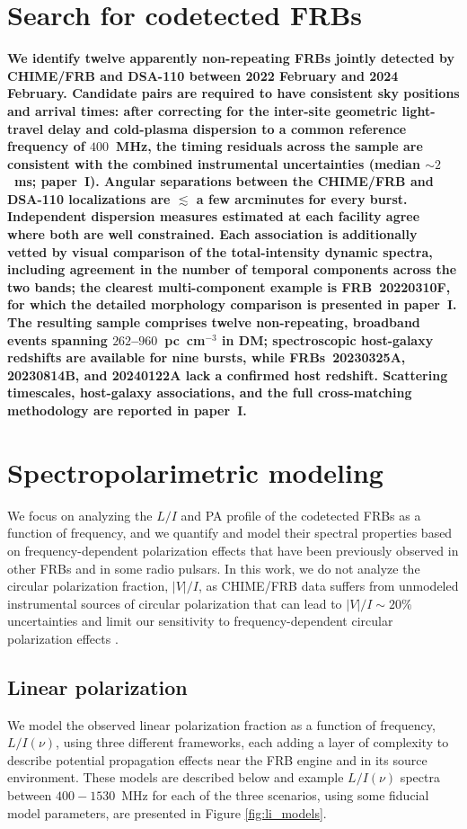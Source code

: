 \documentclass[twocolumn, linenumbers]{aastex701}
\newcommand{\newchange}[1]{{\color{red}\textbf{#1}}}
\begin{document}
\section{Search for codetected FRBs} \label{sec:obs_codetections}
\newchange{We identify twelve apparently non-repeating FRBs jointly detected by CHIME/FRB and DSA-110 between 2022 February and 2024 February. Candidate pairs are required to have consistent sky positions and arrival times: after correcting for the inter-site geometric light-travel delay and cold-plasma dispersion to a common reference frequency of $400$~MHz, the timing residuals across the sample are consistent with the combined instrumental uncertainties (median $\sim 2$~ms; paper~I). Angular separations between the CHIME/FRB and DSA-110 localizations are $\lesssim$ a few arcminutes for every burst. Independent dispersion measures estimated at each facility agree where both are well constrained. Each association is additionally vetted by visual comparison of the total-intensity dynamic spectra, including agreement in the number of temporal components across the two bands; the clearest multi-component example is FRB~20220310F, for which the detailed morphology comparison is presented in paper~I. The resulting sample comprises twelve non-repeating, broadband events spanning $262$--$960$~pc~cm$^{-3}$ in DM; spectroscopic host-galaxy redshifts are available for nine bursts, while FRBs~20230325A, 20230814B, and 20240122A lack a confirmed host redshift. Scattering timescales, host-galaxy associations, and the full cross-matching methodology are reported in paper~I.}


\section{Spectropolarimetric modeling} \label{sec:models}
We focus on analyzing the $L/I$ and PA profile of the codetected FRBs as a function of frequency, and we quantify and model their spectral properties based on frequency-dependent polarization effects that have been previously observed in other FRBs and in some radio pulsars. In this work, we do not analyze the circular polarization fraction, $|V|/I$, as CHIME/FRB data suffers from unmodeled instrumental sources of circular polarization that can lead to $|V|/I\sim 20\%$ uncertainties and limit our sensitivity to frequency-dependent circular polarization effects \citep{2021ApJ...920..138M}.

\subsection{Linear polarization} \label{sec:models_li}
We model the observed linear polarization fraction as a function of frequency, $L/I (\nu)$, using three different frameworks, each adding a layer of complexity to describe potential propagation effects near the FRB engine and in its source environment. These models are described below and example $L/I (\nu)$ spectra between $400-1530$~MHz for each of the three scenarios, using some fiducial model parameters, are presented in Figure \ref{fig:li_models}.
\end{document}
